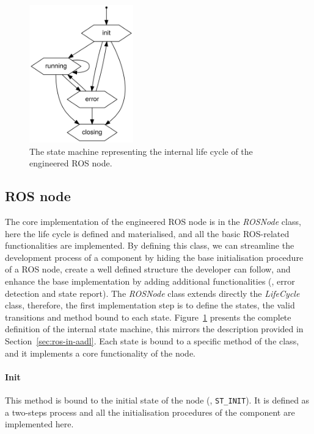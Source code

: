 \begin{figure}[t]
    \centering
    \includegraphics[width=0.4\textwidth]{gfx/state_machine}
    \caption{The state machine representing the internal life cycle of the engineered ROS node.}\label{fig:state-machine}
\end{figure}

\subsection{ROS node}
The core implementation of the engineered ROS node is in the \textit{ROSNode} class, here the life cycle is defined and materialised, and all the basic ROS-related functionalities are implemented. By defining this class, we can streamline the development process of a component by hiding the base initialisation procedure of a ROS node, create a well defined structure the developer can follow, and enhance the base implementation by adding additional functionalities (\eg, error detection and state report). The \textit{ROSNode} class extends directly the \textit{LifeCycle} class, therefore, the first implementation step is to define the states, the valid transitions and method bound to each state. Figure~\ref{fig:state-machine} presents the complete definition of the internal state machine, this mirrors the description provided in Section~\ref{sec:ros-in-aadl}. Each state is bound to a specific method of the class, and it implements a core functionality of the node.

\paragraph{Init} This method is bound to the initial state of the node (\ie, \texttt{ST\_INIT}). It is defined as a two-steps process and all the initialisation procedures of the component are implemented here.

